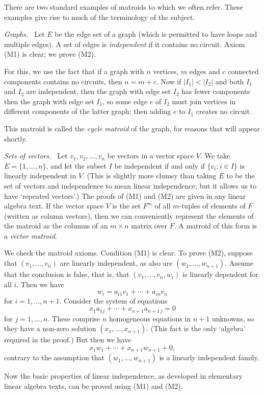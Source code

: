 \documentclass[12pt]{article}
\newcommand{\head}[1]{\medbreak\noindent\textit{#1}\ }
\begin{document}
There are two standard examples of matroids to which we often
refer. These examples give rise to much of the terminology of
the subject.

\head{Graphs.} Let $E$ be the edge set of a graph
(which is permitted to have loops and multiple edges). A set of
edges is \emph{independent} if it contains no circuit. Axiom (M1)
is clear; we prove (M2).

For this, we use the
fact that if a graph with $n$ vertices, $m$ edges and $c$ connected
components contains no circuits, then $n=m+c$. Now if $|I_1|<|I_2|$
and both $I_1$ and $I_2$ are independent, then the graph with edge
set $I_2$ has fewer components then the graph with edge set $I_1$,
so some edge $e$ of $I_2$ must join vertices in different components
of the latter graph; then adding $e$ to $I_1$ creates no circuit.

This matroid is called the \emph{cycle matroid} of the graph, for
reasons that will appear shortly.

\head{Sets of vectors.} Let $v_1, v_2, \ldots, v_n$ be vectors
in a vector space $V$. We take $E=\{1, \ldots, n\}$, and let
the subset $I$ be independent if and only if $\{v_i:i\in I\}$ is
linearly independent in $V$. (This is slightly more clumsy than
taking $E$ to be the set of vectors and independence to mean
linear independence; but it allows us to have `repeated vectors'.)
The proofs of (M1) and (M2) are given in any linear algebra text.
If the vector space $V$ is the set $F^m$ of all $m$-tuples of
elements of $F$ (written as column vectors), then we can
conveniently represent the elements of the matroid as the
columns of an $m\times n$ matrix over $F$. A matroid of this
form is a \emph{vector matroid}.

We check the matroid axioms.
Condition (M1) is clear. To prove (M2), suppose that
$(v_1, \ldots, v_n)$ are linearly independent, as also are
$(w_1, \ldots, w_{n+1})$. Assume that the conclusion is false,
that is, that $(v_1, \ldots, v_n, w_i)$ is linearly dependent
for all $i$. Then we have
\[w_i=a_{i1}v_1+\cdots+a_{in}v_n\]
for $i=1, \ldots, n+1$. Consider the system of equations
\[x_1a_{1j}+\cdots+x_{n+1}a_{n+1\,j}=0\]
for $j=1, \ldots, n$. These comprise $n$ homogeneous equations
in $n+1$ unknowns, so they have a non-zero solution $(x_1, \ldots,
x_{n+1})$. (This fact is the only `algebra' required in the
proof.) But then we have
\[x_1w_1+\cdots+x_{n+1}w_{n+1}+0,\]
contrary to the assumption that $(w_1, \ldots, w_{n+1})$ is a
linearly independent family.

Now the basic properties of linear independence, as developed in
elementary linear algebra texts, can be proved using (M1) and
(M2). 
\end{document}
